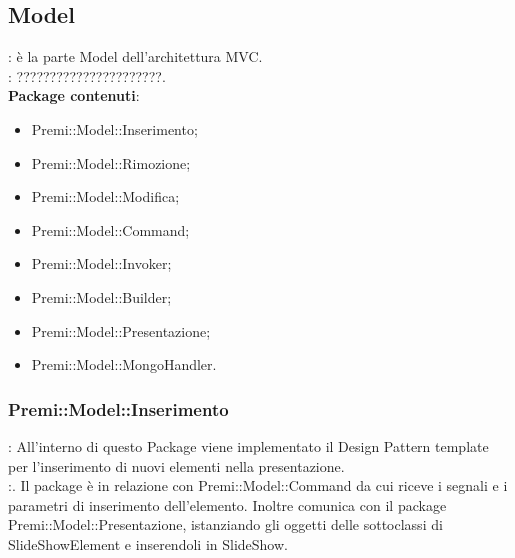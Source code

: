 \subsection{Model}{
	\textbf{\tipo}: è la parte Model dell'architettura MVC.\\
	\textbf{\relaz}: ??????????????????????.\\
	\textbf{Package contenuti}: 
	\begin{itemize}
	\item Premi::Model::Inserimento;
    \item Premi::Model::Rimozione;
    \item Premi::Model::Modifica;
    \item Premi::Model::Command;
    \item Premi::Model::Invoker;
    \item Premi::Model::Builder;
    \item Premi::Model::Presentazione;
    \item Premi::Model::MongoHandler.
	\end{itemize}
	\subsubsection{Premi::Model::Inserimento}{
		\textbf{\tipo}: All’interno di questo Package viene implementato il Design Pattern template per l’inserimento di nuovi elementi nella presentazione.\\
		\textbf{\relaz}:. Il package è in relazione con Premi::Model::Command da cui riceve i segnali e i parametri di inserimento dell’elemento. Inoltre comunica con il package Premi::Model::Presentazione, istanziando gli oggetti delle sottoclassi di SlideShowElement e inserendoli in SlideShow.\\
	
}}
